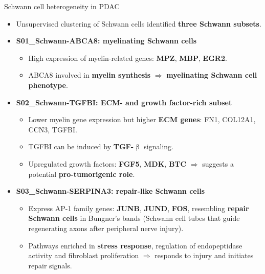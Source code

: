 \documentclass[10pt]{beamer}
\theoremstyle{plain}
\begin{document}
\begin{frame}{Schwann cell heterogeneity in PDAC}
  \begin{itemize}
    \item Unsupervised clustering of Schwann cells identified \textbf{three Schwann subsets}.

    \item \textbf{S01\_Schwann-ABCA8: myelinating Schwann cells}
      \begin{itemize}
        \item High expression of myelin-related genes: \textbf{MPZ}, \textbf{MBP}, \textbf{EGR2}.
        \item ABCA8 involved in \textbf{myelin synthesis} \(\Rightarrow\) \textbf{myelinating Schwann cell phenotype}.
      \end{itemize}

    \item \textbf{S02\_Schwann-TGFBI: ECM- and growth factor-rich subset}
      \begin{itemize}
        \item Lower myelin gene expression but higher \textbf{ECM genes}: FN1, COL12A1, CCN3, TGFBI.
        \item TGFBI can be induced by \textbf{TGF-\(\upbeta\)} signaling.
        \item Upregulated growth factors: \textbf{FGF5}, \textbf{MDK}, \textbf{BTC}
              \(\Rightarrow\) suggests a potential \textbf{pro-tumorigenic role}.
      \end{itemize}

    \item \textbf{S03\_Schwann-SERPINA3: repair-like Schwann cells}
      \begin{itemize}
        \item Express AP-1 family genes: \textbf{JUNB}, \textbf{JUND}, \textbf{FOS}, resembling \textbf{repair Schwann cells} in Bungner's bands (Schwann cell tubes that guide regenerating axons after peripheral nerve injury).
        \item Pathways enriched in \textbf{stress response}, regulation of endopeptidase activity and fibroblast proliferation
              \(\Rightarrow\) responds to injury and initiates repair signals.
      \end{itemize}
  \end{itemize}
\end{frame}
\end{document}
